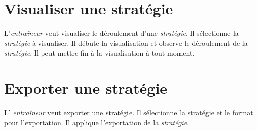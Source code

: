 \section{Visualiser une stratégie}
\label{sec:visualiser_une_strategie}

L'\textit{entra\^ineur} veut visualiser le d\'eroulement d'une \textit{strat\'egie}.
Il s\'electionne la \textit{strat\'egie} \`a visualiser.
Il d\'ebute la visualisation et observe le d\'eroulement de la \textit{strat\'egie}.
Il peut mettre fin \`a la visualisation \`a tout moment.

\section{Exporter une stratégie}
\label{sec:exporter_une_strategie}

L' \textit{entra\^ineur} veut exporter une strat\'egie.
Il s\'electionne la strat\'egie et le format pour l'exportation.
Il applique l'exportation de la \textit{strat\'egie}.
